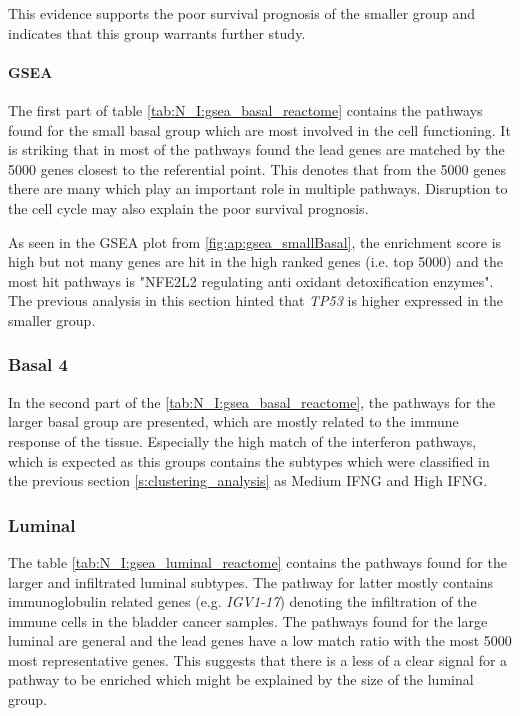 This evidence supports the poor survival prognosis of the smaller group and indicates that this group warrants further study.

\paragraph*{GSEA}

The first part of table \cref{tab:N_I:gsea_basal_reactome} contains the pathways found for the small basal group which are most involved in the cell functioning. It is striking that in most of the pathways found the lead genes are matched by the 5000 genes closest to the referential point. This denotes that from the 5000 genes there are many which play an important role in multiple pathways. Disruption to the cell cycle may also explain the poor survival prognosis. 

As seen in the GSEA plot from \cref{fig:ap:gsea_smallBasal}, the enrichment score is high but not many genes are hit in the high ranked genes (i.e. top 5000) and the most hit pathways is "NFE2L2 regulating anti oxidant detoxification enzymes". The previous analysis in this section hinted that \textit{TP53} is higher expressed in the smaller group. 

\subsubsection* {Basal 4}

In the second part of the \cref{tab:N_I:gsea_basal_reactome}, the pathways for the larger basal group are presented, which are mostly related to the immune response of the tissue. Especially the high match of the interferon pathways, which is expected as this groups contains the subtypes which were classified in the previous section \cref{s:clustering_analysis} as Medium IFNG and High IFNG. 


\subsubsection*{Luminal}

The table \cref{tab:N_I:gsea_luminal_reactome} contains the pathways found for the larger and infiltrated luminal subtypes. The pathway for latter mostly contains immunoglobulin related genes (e.g. \textit{IGV1-17}) denoting the infiltration of the immune cells in the bladder cancer samples. The pathways found for the large luminal are general and the lead genes have a low match ratio with the most 5000 most representative genes. This suggests that there is a less of a clear signal for a pathway to be enriched which might be explained by the size of the luminal group. 

